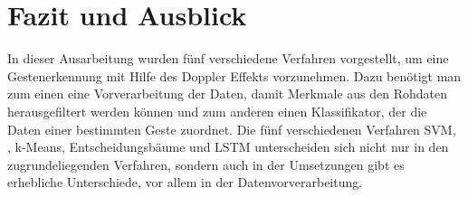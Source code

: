 \section{Fazit und Ausblick} 

In dieser Ausarbeitung wurden fünf verschiedene Verfahren vorgestellt, um eine
Gestenerkennung mit Hilfe des Doppler Effekts vorzunehmen. Dazu benötigt man zum
einen eine Vorverarbeitung der Daten, damit Merkmale aus den Rohdaten
herausgefiltert werden können und zum anderen einen Klassifikator, der die Daten
einer bestimmten Geste zuordnet. Die fünf verschiedenen Verfahren \ac{SVM},
, k-Means, Entscheidungsbäume und \ac{LSTM} unterscheiden sich nicht
nur in den zugrundeliegenden Verfahren, sondern auch in der Umsetzungen gibt es
erhebliche Unterschiede, vor allem in der Datenvorverarbeitung.

